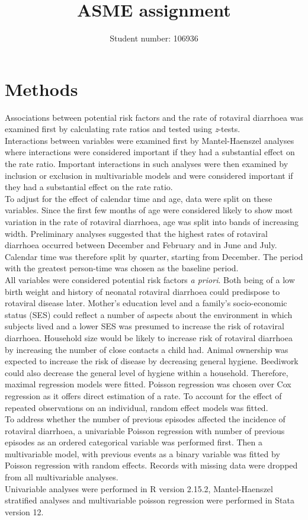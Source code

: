 \documentclass[11pt,a4paper]{article}\usepackage{graphicx, color}
\title{ASME assignment}
\author{Student number: 106936}
\begin{document}



\section{Methods}
Associations between potential risk factors and the rate of rotaviral diarrhoea was examined first by calculating rate ratios and tested using \textit{z}-tests. \\
\indent Interactions between variables were examined first by Mantel-Haenszel analyses where interactions were considered important if they had a substantial effect on the rate ratio.
Important interactions in such analyses were then examined by inclusion or exclusion in multivariable models and were considered important if they had a substantial effect on the rate ratio.\\
\indent To adjust for the effect of calendar time and age, data were split on these variables. 
Since the first few months of age were considered likely to show most variation in the rate of rotaviral diarrhoea, age was split into bands of increasing width. 
Preliminary analyses suggested that the highest rates of rotaviral diarrhoea occurred between December and February and in June and July. 
Calendar time was therefore split by quarter, starting from December.
The period with the greatest person-time was chosen as the baseline period.\\
\indent All variables were considered potential risk factors \textit{a priori}. 
Both being of a low birth weight and history of neonatal rotaviral diarrhoea could predispose to rotaviral disease later. 
Mother's education level and a family's socio-economic status (SES) could reflect a number of aspects about the environment in which subjects lived and a lower SES was presumed to increase the risk of rotaviral diarrhoea. 
Household size would be likely to increase risk of rotaviral diarrhoea by increasing the number of close contacts a child had. 
Animal ownership was expected to increase the risk of  disease by decreasing general hygiene. 
Beediwork could also decrease the general level of hygiene within a household. 
Therefore, maximal regression models were fitted. 
Poisson regression was chosen over Cox regression as it offers direct estimation of a rate. 
To account for the effect of repeated observations on an individual, random effect models was fitted. \\
\indent To address whether the number of previous episodes affected the incidence of rotaviral diarrhoea, a univariable Poisson regression with number of previous episodes as an ordered categorical variable was performed first.
Then a multivariable model, with previous events as a binary variable was fitted by Poisson regression with random effects.
Records with missing data were dropped from all multivariable analyses.\\
\indent Univariable analyses were performed in R version 2.15.2, Mantel-Haenszel stratified analyses and multivariable poisson regression were performed in Stata version 12.\\
%
\end{document}
